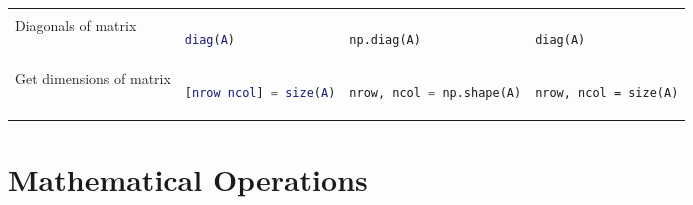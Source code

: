 \documentclass[10pt, landscape]{article}
\begin{document}
\begin{multicols}{2}
\begin{tabular}[]{@{}llll@{}}
\begin{minipage}[t]{0.20\columnwidth}
\strut
\end{minipage}\tabularnewline
\begin{minipage}[t]{0.23\columnwidth}\raggedright\strut
Diagonals of matrix\strut
\end{minipage} & \begin{minipage}[t]{0.23\columnwidth}\raggedright\strut
\begin{lstlisting}[language=Matlab]
diag(A)
\end{lstlisting}
\strut
\end{minipage} & \begin{minipage}[t]{0.23\columnwidth}\raggedright\strut
\begin{lstlisting}[language=Python]
np.diag(A)
\end{lstlisting}
\strut
\end{minipage} & \begin{minipage}[t]{0.20\columnwidth}\raggedright\strut
\begin{lstlisting}
diag(A)
\end{lstlisting}
\strut
\end{minipage}\tabularnewline
\begin{minipage}[t]{0.23\columnwidth}\raggedright\strut
Get dimensions of matrix\strut
\end{minipage} & \begin{minipage}[t]{0.23\columnwidth}\raggedright\strut
\begin{lstlisting}[language=Matlab]
[nrow ncol] = size(A)
\end{lstlisting}
\strut
\end{minipage} & \begin{minipage}[t]{0.23\columnwidth}\raggedright\strut
\begin{lstlisting}[language=Python]
nrow, ncol = np.shape(A)
\end{lstlisting}
\strut
\end{minipage} & \begin{minipage}[t]{0.20\columnwidth}\raggedright\strut
\begin{lstlisting}
nrow, ncol = size(A)
\end{lstlisting}
\strut
\end{minipage}\tabularnewline
\bottomrule
\end{tabular}

\section{Mathematical Operations}\label{mathematical-operations}


\end{multicols}
\end{document}
